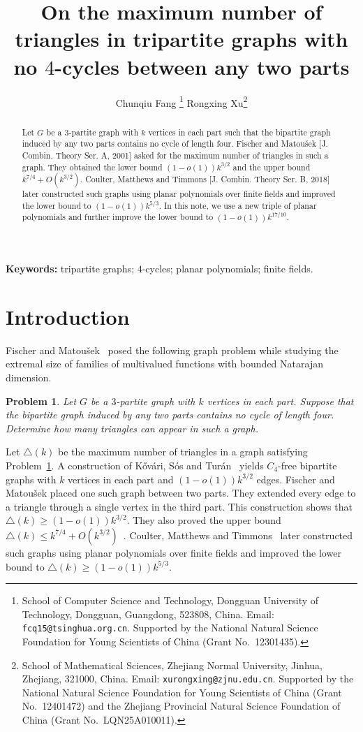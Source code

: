 \documentclass[12pt]{article}
\title{\large{\bfseries On the maximum number of triangles in tripartite
graphs with no $4$-cycles between any two parts}}
\author{
  Chunqiu Fang \thanks{School of Computer Science and Technology, Dongguan University of Technology, Dongguan, Guangdong, 523808, China. Email: \texttt{fcq15@tsinghua.org.cn}. Supported by the National Natural Science Foundation for Young Scientists of China (Grant No.~12301435).}
  \quad
  Rongxing Xu\thanks{School of Mathematical Sciences, Zhejiang Normal University, Jinhua, Zhejiang, 321000, China. Email: \texttt{xurongxing@zjnu.edu.cn}. Supported by the National Natural Science Foundation for Young Scientists of China (Grant No.~12401472) and the Zhejiang Provincial Natural Science Foundation of China (Grant No.~LQN25A010011).}
}
\date{}
\numberwithin{equation}{section}
\newtheorem{problem}[theorem]{Problem}
\theoremstyle{definition}
\begin{document}
\maketitle

\begin{abstract}
Let $G$ be a $3$-partite graph with $k$ vertices in each part such that the bipartite graph induced by any two parts contains no cycle of length four. Fischer and Matou\v{s}ek [J. Combin. Theory Ser. A, 2001] asked for the maximum number of triangles in such a graph. They obtained the lower bound $(1-o(1))k^{3/2}$ and the upper bound $k^{7/4}+O(k^{3/2})$. Coulter, Matthews and Timmons [J. Combin. Theory Ser. B, 2018] later constructed such graphs using planar polynomials over finite fields and improved the lower bound to $(1-o(1))k^{5/3}$. In this note, we use a new triple of planar polynomials and further improve the lower bound to $(1-o(1))k^{17/10}$.
\end{abstract}

\noindent\textbf{Keywords:} tripartite graphs; $4$-cycles; planar polynomials; finite fields.

\section{Introduction}

Fischer and Matou\v{s}ek~\cite{FischerMatousek2001} posed the following graph problem while studying the extremal size of families of multivalued functions with bounded Natarajan dimension.

\begin{problem}\label{prob:FM}
Let $G$ be a $3$-partite graph with $k$ vertices in each part. Suppose that the bipartite graph induced by any two parts contains no cycle of length four. Determine how many triangles can appear in such a graph.
\end{problem}

Let $\triangle(k)$ be the maximum number of triangles in a graph satisfying Problem~\ref{prob:FM}. A construction of K\H{o}v\'ari, S\'os and Tur\'an~\cite{KovariSosTuran1954} yields $C_4$-free bipartite graphs with $k$ vertices in each part and $(1-o(1))k^{3/2}$ edges. Fischer and Matou\v{s}ek placed one such graph between two parts. They extended every edge to a triangle through a single vertex in the third part. This construction shows that $\triangle(k)\ge (1-o(1))k^{3/2}$. They also proved the upper bound $\triangle(k)\le k^{7/4}+O(k^{3/2})$~\cite{FischerMatousek2001}.
Coulter, Matthews and Timmons~\cite{CMT2018} later constructed such graphs using planar polynomials over finite fields and improved the lower bound to $\triangle(k)\ge(1-o(1))k^{5/3}$.
\end{document}
